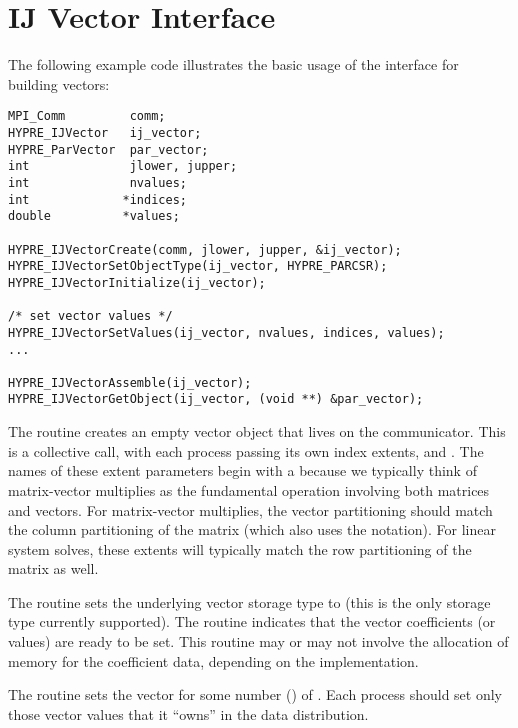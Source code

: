
\section{IJ Vector Interface}

The following example code illustrates the basic usage of the
 interface for building vectors:

\begin{display}
\begin{verbatim}
MPI_Comm         comm;
HYPRE_IJVector   ij_vector;
HYPRE_ParVector  par_vector;
int              jlower, jupper;
int              nvalues;
int             *indices;
double          *values;

HYPRE_IJVectorCreate(comm, jlower, jupper, &ij_vector);
HYPRE_IJVectorSetObjectType(ij_vector, HYPRE_PARCSR);
HYPRE_IJVectorInitialize(ij_vector);

/* set vector values */
HYPRE_IJVectorSetValues(ij_vector, nvalues, indices, values);
...

HYPRE_IJVectorAssemble(ij_vector);
HYPRE_IJVectorGetObject(ij_vector, (void **) &par_vector);

\end{verbatim}
\end{display}
The  routine creates an empty vector object that lives
on the  communicator.  This is a collective call, with each
process passing its own index extents,  and
.  The names of these extent parameters begin with a
 because we typically think of matrix-vector multiplies as
the fundamental operation involving both matrices and vectors.  For
matrix-vector multiplies, the vector partitioning should match the
column partitioning of the matrix (which also uses the 
notation).  For linear system solves, these extents will typically
match the row partitioning of the matrix as well.

The  routine sets the underlying vector storage
type to  (this is the only storage type currently
supported).  The  routine indicates that the vector
coefficients (or values) are ready to be set.  This routine may or may
not involve the allocation of memory for the coefficient data,
depending on the implementation.

The  routine sets the vector  for some
number () of .  Each process should set
only those vector values that it ``owns'' in the data distribution.

